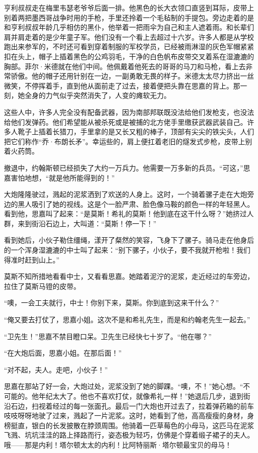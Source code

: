 \par 亨利叔叔走在梅里韦瑟老爷爷后面一排。他黑色的长大衣领口直竖到耳际，皮带上别着两把墨西哥战争时用的手枪，手里还拎着一个毛毡制的手提包。旁边走着的是和亨利叔叔年龄几乎相仿的黑仆，他举着一把雨伞为自己和主人遮着雨。和长辈们肩并肩走着的是少年童子军。他们没有一个看上去超过十六岁。许多人都是从学校跑出来参军的，不时还可看到穿着制服的军校学员，已经被雨淋湿的灰色军帽紧紧扣在头上，帽子上插着黑色的公鸡羽毛，干净的白色帆布皮带交叉着系在湿漉漉的胸部。菲尔·米德就在他们中间。他佩戴着他死去的哥哥的马刀和马枪，看上去非常骄傲。他的帽子还用针别在一边，一副勇敢无畏的样子。米德太太尽力挤出一丝微笑，不停挥着手，直到他从面前走了过去，接着便把头靠在思嘉的背上。那一刻，她全身的力气似乎突然消失了，人变的瘫软无力。
\par 这些人中，许多人完全没有配备武器，因为南部邦联既没法给他们发枪支，也没法给他们发弹药。他们希望能从被杀死或是被捕的北方佬手里缴获武器武装自己。许多人靴子上插着长猎刀，手里拿的是又长又粗的棒子，顶部有尖尖的铁尖头，人们把它们称作“乔·布朗长矛”。幸运些的，肩上便扛着老旧的燧发式步枪，皮带上别着火药筒。
\par 撤退中，约翰斯顿已经损失了大约一万兵力。他需要一万多新的兵员。“可这，”思嘉害怕地想，“就是他所能得到的！”
\par 大炮隆隆驶过，溅起的泥浆洒到了欢送的人身上。这时，一个骑着骡子走在大炮旁边的黑人吸引了她的视线。这是个一脸严肃、脸色像马鞍的颜色一样的年轻黑人。看到他，思嘉叫了起来：“是莫斯！希礼的莫斯！他到底在这干什么呀？”她挤过人群，来到街沿石边上，大叫道：“莫斯！停一下！”
\par 看到她后，小伙子勒住缰绳，漾开了粲然的笑容，飞身下了骡子。骑马走在他身后的一个浑身湿漉漉的中士叫了起来：“别下骡子，小伙子，要不我就开枪啦！我们得准时赶到山上。”
\par 莫斯不知所措地看看中士，又看看思嘉。她踏着泥泞的泥浆，走近经过的车旁边，拉住了莫斯马镫的皮带。
\par “噢，一会工夫就行，中士！你别下来，莫斯。你到底到这来干什么？”
\par “俺又要去打仗了，思嘉小姐。这次不是和希礼先生，而是和约翰老先生一起去。”
\par “卫先生！”思嘉不禁目瞪口呆。卫先生已经快七十岁了。“他在哪？”
\par “在大炮后面，思嘉小姐。在那后面！”
\par “对不起，夫人。走吧，小伙子！”
\par 思嘉在那站了好一会，大炮过处，泥浆没到了她的脚踝。“噢，不！”她心想。“不可能的。他年纪太大了。他也不喜欢打仗，就像希礼一样！”她退后几步，退到街沿石边，扫视着经过的每一张面孔。最后一门大炮也开过去了，拉着弹药箱的前车吱吱呀呀地驶了过来，溅起了一片泥浆。这时，她看到了他，高高瘦瘦的身材，身榜挺直，银白的长发披散在脖颈周围。他骑着一匹草莓色的小母马，这匹马在泥浆飞溅、坑坑洼洼的路上择路而行，姿态极为轻巧，仿佛是个穿着缎子裙子的夫人。哦——那是内利！塔尔顿太太的内利！比阿特丽斯·塔尔顿最宝贝的母马！
